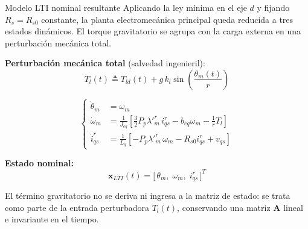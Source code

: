 \documentclass[aspectratio=169,t]{beamer}
\begin{document}
\begin{frame}{Modelo LTI nominal resultante}
{\small\color{uncGray}Aplicando la ley mínima en el eje $d$ y fijando $R_s=R_{s0}$ constante, la planta electromecánica principal queda reducida a tres estados dinámicos. El torque gravitatorio se agrupa con la carga externa en una perturbación mecánica total.}\par
\vspace{2mm}

\textbf{Perturbación mecánica total} (salvedad ingenieril):
\begin{equation*}
T_l(t) \triangleq T_{ld}(t) + g\,k_l\sin\!\left(\frac{\theta_m(t)}{r}\right)
\end{equation*}

\footnotesize
\begin{equation*}
\left\{
\begin{aligned}
\dot{\theta}_m &= \omega_m \\[2pt]
\dot{\omega}_m &= \frac{1}{J_{eq}}\!\left[\frac{3}{2}P_p\lambda'^r_m\,i_{qs}^r-b_{eq}\omega_m-\frac{1}{r}T_l\right] \\[4pt]
\dot{i}_{qs}^r &= \frac{1}{L_q}\!\left[-P_p\lambda'^r_m\,\omega_m-R_{s0}i_{qs}^r+v_{qs}\right]
\end{aligned}
\right.
\end{equation*}
\normalsize

\textbf{Estado nominal:}
\begin{equation*}
\bm{x}_{LTI}(t)=\big[\,\theta_m,\;\omega_m,\;i_{qs}^r\,\big]^T
\end{equation*}

{\small El término gravitatorio no se deriva ni ingresa a la matriz de estado: se trata como parte de la entrada perturbadora $T_l(t)$, conservando una matriz $\bm{A}$ lineal e invariante en el tiempo.}
\end{frame}
\end{document}
